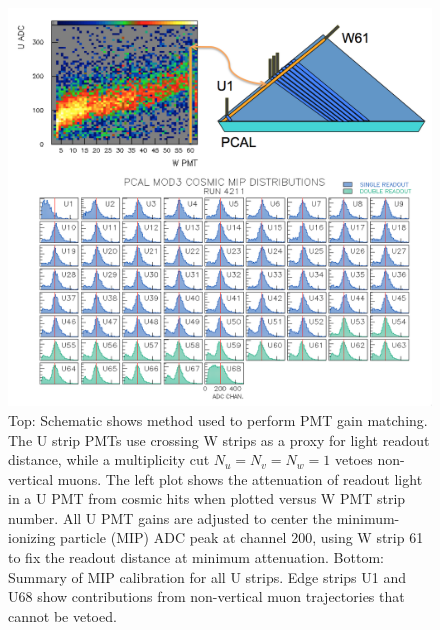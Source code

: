 \begin{figure}[hbt]
\centering
\includegraphics[width=0.95\columnwidth,keepaspectratio]{img/S5_4.png}
\caption{Top: Schematic shows method used to perform PMT gain matching. The U strip PMTs use crossing W
  strips as a proxy for light readout distance, while a multiplicity cut $N_u=N_v=N_w=1$ vetoes non-vertical muons.
  The left plot shows the attenuation of readout light in a U PMT from cosmic hits when plotted versus W PMT strip
  number. All U PMT gains are adjusted to center the minimum-ionizing particle (MIP) ADC peak at channel 200,
  using W strip 61 to fix the readout distance at minimum attenuation. Bottom: Summary of MIP calibration for all
  U strips. Edge strips U1 and U68 show contributions from non-vertical muon trajectories that cannot be vetoed.}
\label{fig:S5_4}
\end{figure}


